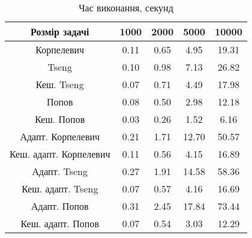 \begin{table}[H]
	\centering
	\begin{tabular}{|c||c|c|c|c|}\hline
		Розмір задачі & 1000 & 2000 & 5000 & 10000 \\ \hline \hline
		Корпелевич & 0.11 & 0.65 & 4.95 & 19.31 \\ \hline
		Tseng & 0.10 & 0.98 & 7.13 & 26.82 \\ \hline
		Кеш. Tseng & 0.07 & 0.71 & 4.49 & 17.98 \\ \hline
		Попов & 0.08 & 0.50 & 2.98 & 12.18 \\ \hline
		Кеш. Попов & 0.03 & 0.26 & 1.52 & 6.16 \\ \hline \hline
		Адапт. Корпелевич & 0.21 & 1.71 & 12.70 & 50.57 \\ \hline
		Кеш. адапт. Корпелевич & 0.11 & 0.56 & 4.15 & 16.89 \\ \hline
		Адапт. Tseng & 0.27 & 1.91 & 14.58 & 58.36 \\ \hline
		Кеш. адапт. Tseng & 0.07 & 0.57 & 4.16 & 16.69 \\ \hline
		Адапт. Попов & 0.31 & 2.45 & 17.84 & 73.44 \\ \hline
		Кеш. адапт. Попов & 0.07 & 0.54 & 3.03 & 12.29 \\ \hline
	\end{tabular}
	\caption{Час виконання, секунд}
\end{table}
